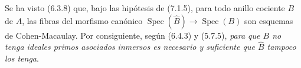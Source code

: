 \begin{remark}[7.1.6]
\label{IV.2.s7.1.6-fr}
Se ha visto (6.3.8) que, bajo las hipótesis de
(7.1.5), para todo anillo cociente $B$ de $A$,
las fibras del morfismo canónico
$\operatorname{Spec}(\widehat B)\to\operatorname{Spec}(B)$
son esquemas de Cohen-Macaulay. Por consiguiente,
según (6.4.3) y (5.7.5), \emph{para que $B$ no tenga
ideales primos asociados inmersos es necesario y
suficiente que $\widehat B$ tampoco los tenga}.
\end{remark}
